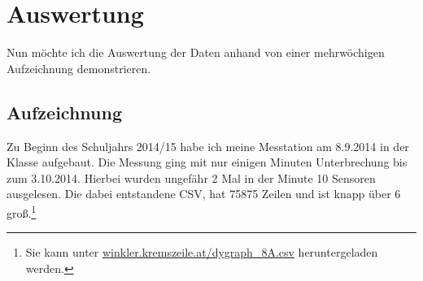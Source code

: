 \chapter{Auswertung}
\label{cha:Auswertung}

Nun möchte ich die Auswertung der Daten anhand von einer mehrwöchigen Aufzeichnung demonstrieren.

\section{Aufzeichnung}
\label{auswertung_aufzeichnung}

Zu Beginn des Schuljahrs 2014/15 habe ich meine Messtation am 8.9.2014 in der Klasse aufgebaut. Die Messung ging mit nur einigen Minuten Unterbrechung bis zum 3.10.2014. Hierbei wurden ungefähr 2 Mal in der Minute 10 Sensoren ausgelesen. Die dabei entstandene \gls{CSV}, hat 75875 Zeilen und ist knapp über \SI{6}{\mega\byte} groß.\footnote{Sie kann unter \href{http://winkler.kremszeile.at/dygraph_8A.csv}{winkler.kremszeile.at/dygraph\_8A.csv} heruntergeladen werden.}